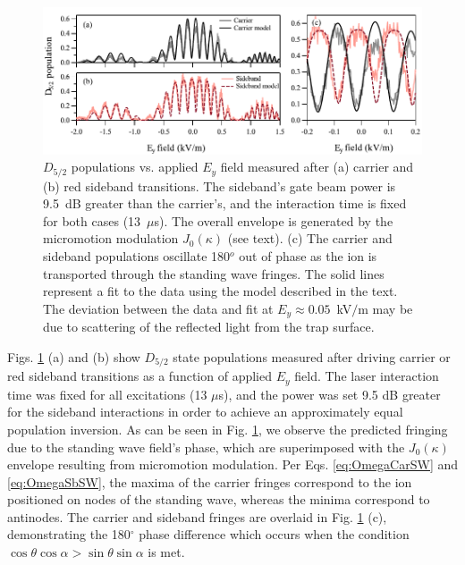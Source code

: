 \begin{figure}
    \begin{center}
        \includegraphics{figures/4/Fig_fringes3}
        \caption{\label{fig:fringes} $D_{5/2}$ populations vs. applied $E_y$ field measured after (a) carrier and (b) red sideband transitions. The sideband's gate beam power is 9.5~dB greater than the carrier's, and the interaction time is fixed for both cases (13~$\mu$s).  The overall envelope is generated by the micromotion modulation $J_0(\kappa)$ (see text). (c) The carrier and sideband populations oscillate 180$^o$ out of phase as the ion is transported through the standing wave fringes. The solid lines represent a fit to the data using the model described in the text. The deviation between the data and fit at $E_y\approx0.05$~kV$/$m may be due to scattering of the reflected light from the trap surface.}
    \end{center}
\end{figure} 



Figs. \ref{fig:fringes} (a) and (b) show $D_{5/2}$ state populations measured after driving carrier or red sideband transitions as a function of applied $E_y$ field. The laser interaction time was fixed for all excitations (13 $\mu$s), and the power was set 9.5 dB greater for the sideband interactions in order to achieve an approximately equal population inversion. As can be seen in Fig. \ref{fig:fringes}, we observe the predicted fringing due to the standing wave field's phase, which are superimposed with the $J_0(\kappa)$ envelope resulting from micromotion modulation. Per Eqs. \ref{eq:OmegaCarSW} and \ref{eq:OmegaSbSW}, the maxima of the carrier fringes correspond to the ion positioned on nodes of the standing wave, whereas the minima correspond to antinodes. The carrier and sideband fringes are overlaid in Fig. \ref{fig:fringes} (c), demonstrating the 180$^{\circ}$ phase difference which occurs when the condition $\cos \theta \cos \alpha > \sin \theta \sin \alpha$ is met.



